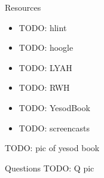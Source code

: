 \documentclass{beamer}
\begin{document}
\begin{frame}{Resources}
  \begin{itemize}
    \item TODO: hlint
    \item TODO: hoogle
    \item TODO: LYAH
    \item TODO: RWH
    \item TODO: YesodBook
    \item TODO: screencasts
  \end{itemize}
  TODO: pic of yesod book
\end{frame}

\begin{frame}{Questions}
  TODO: Q pic
\end{frame}
\end{document}
